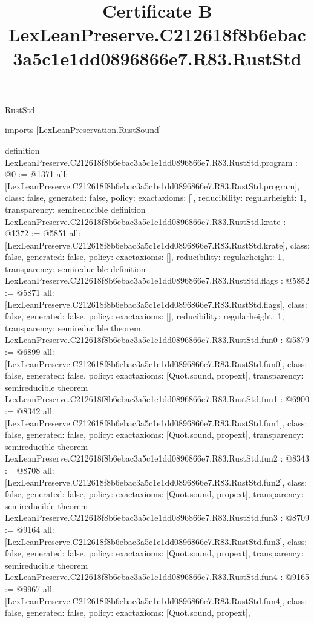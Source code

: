 \begin{lexlean}{RustStd}
\title{Certificate B LexLeanPreserve.C212618f8b6ebac3a5c1e1dd0896866e7.R83.RustStd}
\begin{coremodule}
imports [LexLeanPreservation.RustSound]

definition LexLeanPreserve.C212618f8b6ebac3a5c1e1dd0896866e7.R83.RustStd.program : @0 := @1371 {
  all: [LexLeanPreserve.C212618f8b6ebac3a5c1e1dd0896866e7.R83.RustStd.program],
  class: false,
  generated: false,
  policy: exact{axioms: []},
  reducibility: regular{height: 1},
  transparency: semireducible
}
definition LexLeanPreserve.C212618f8b6ebac3a5c1e1dd0896866e7.R83.RustStd.krate : @1372 := @5851 {
  all: [LexLeanPreserve.C212618f8b6ebac3a5c1e1dd0896866e7.R83.RustStd.krate],
  class: false,
  generated: false,
  policy: exact{axioms: []},
  reducibility: regular{height: 1},
  transparency: semireducible
}
definition LexLeanPreserve.C212618f8b6ebac3a5c1e1dd0896866e7.R83.RustStd.flags : @5852 := @5871 {
  all: [LexLeanPreserve.C212618f8b6ebac3a5c1e1dd0896866e7.R83.RustStd.flags],
  class: false,
  generated: false,
  policy: exact{axioms: []},
  reducibility: regular{height: 1},
  transparency: semireducible
}
theorem LexLeanPreserve.C212618f8b6ebac3a5c1e1dd0896866e7.R83.RustStd.fun0 : @5879 := @6899 {
  all: [LexLeanPreserve.C212618f8b6ebac3a5c1e1dd0896866e7.R83.RustStd.fun0],
  class: false,
  generated: false,
  policy: exact{axioms: [Quot.sound, propext]},
  transparency: semireducible
}
theorem LexLeanPreserve.C212618f8b6ebac3a5c1e1dd0896866e7.R83.RustStd.fun1 : @6900 := @8342 {
  all: [LexLeanPreserve.C212618f8b6ebac3a5c1e1dd0896866e7.R83.RustStd.fun1],
  class: false,
  generated: false,
  policy: exact{axioms: [Quot.sound, propext]},
  transparency: semireducible
}
theorem LexLeanPreserve.C212618f8b6ebac3a5c1e1dd0896866e7.R83.RustStd.fun2 : @8343 := @8708 {
  all: [LexLeanPreserve.C212618f8b6ebac3a5c1e1dd0896866e7.R83.RustStd.fun2],
  class: false,
  generated: false,
  policy: exact{axioms: [Quot.sound, propext]},
  transparency: semireducible
}
theorem LexLeanPreserve.C212618f8b6ebac3a5c1e1dd0896866e7.R83.RustStd.fun3 : @8709 := @9164 {
  all: [LexLeanPreserve.C212618f8b6ebac3a5c1e1dd0896866e7.R83.RustStd.fun3],
  class: false,
  generated: false,
  policy: exact{axioms: [Quot.sound, propext]},
  transparency: semireducible
}
theorem LexLeanPreserve.C212618f8b6ebac3a5c1e1dd0896866e7.R83.RustStd.fun4 : @9165 := @9967 {
  all: [LexLeanPreserve.C212618f8b6ebac3a5c1e1dd0896866e7.R83.RustStd.fun4],
  class: false,
  generated: false,
  policy: exact{axioms: [Quot.sound, propext]},
}
\end{coremodule}
\end{lexlean}
